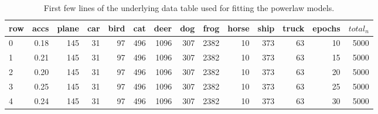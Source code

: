 \documentclass{article} %
\begin{document}
\begin{table}[h!]
    \centering
    \begin{tabular}{lrrrrrrrrrrrrr}
        row & accs & plane & car & bird & cat & deer & dog & frog & horse & ship & truck & epochs & $total_n$ \\
        \hline
        0   & 0.18 & 145   & 31  & 97   & 496 & 1096 & 307 & 2382 & 10    & 373  & 63    & 10     & 5000      \\
        1   & 0.21 & 145   & 31  & 97   & 496 & 1096 & 307 & 2382 & 10    & 373  & 63    & 15     & 5000      \\
        2   & 0.20 & 145   & 31  & 97   & 496 & 1096 & 307 & 2382 & 10    & 373  & 63    & 20     & 5000      \\
        3   & 0.25 & 145   & 31  & 97   & 496 & 1096 & 307 & 2382 & 10    & 373  & 63    & 25     & 5000      \\
        4   & 0.24 & 145   & 31  & 97   & 496 & 1096 & 307 & 2382 & 10    & 373  & 63    & 30     & 5000      \\
    \end{tabular}
    \caption{First few lines of the underlying data table used for fitting the powerlaw models.}
    \label{table:datatable_results}
\end{table}
\end{document}
